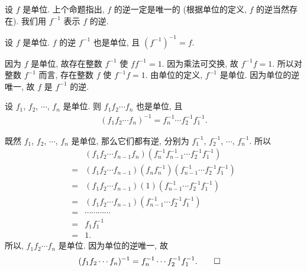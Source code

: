 \begin{definition}
    设 $f$ 是单位. 上个命题指出, $f$ 的逆一定是唯一的 (根据单位的定义, $f$ 的逆当然存在). 我们用 $f^{-1}$ 表示 $f$ 的逆.
\end{definition}

\begin{proposition}
    设 $f$ 是单位. $f$ 的逆 $f^{-1}$ 也是单位, 且 $(f^{-1})^{-1} = f$.
\end{proposition}

\begin{pf}
    因为 $f$ 是单位, 故存在整数 $f^{-1}$ 使 $ff^{-1} = 1$. 因为乘法可交换, 故 $f^{-1} f = 1$. 所以对整数 $f^{-1}$ 而言, 存在整数 $f$ 使 $f^{-1} f = 1$. 由单位的定义, $f^{-1}$ 是单位. 因为单位的逆唯一, 故 $f$ 是 $f^{-1}$ 的逆.
\end{pf}

\begin{proposition}
    设 $f_1$, $f_2$, $\cdots$, $f_n$ 是单位. 则 $f_1 f_2 \cdots f_n$ 也是单位, 且
    \begin{align*}
        (f_1 f_2 \cdots f_n)^{-1} = f_n^{-1} \cdots f_2^{-1} f_1^{-1}.
    \end{align*}
\end{proposition}

\begin{pf}
    既然 $f_1$, $f_2$, $\cdots$, $f_n$ 是单位, 那么它们都有逆, 分别为 $f_1^{-1}$, $f_2^{-1}$, $\cdots$, $f_n^{-1}$. 所以
    \begin{align*}
             & (f_1 f_2 \cdots f_{n-1} f_n) (f_n^{-1} f_{n-1}^{-1} \cdots f_2^{-1} f_1^{-1})   \\
        = {} & (f_1 f_2 \cdots f_{n-1}) (f_n f_n^{-1}) (f_{n-1}^{-1} \cdots f_2^{-1} f_1^{-1}) \\
        = {} & (f_1 f_2 \cdots f_{n-1}) (1) (f_{n-1}^{-1} \cdots f_2^{-1} f_1^{-1})            \\
        = {} & (f_1 f_2 \cdots f_{n-1}) (f_{n-1}^{-1} \cdots f_2^{-1} f_1^{-1})                \\
        = {} & \cdots \cdots \cdots \cdots                                                     \\
        = {} & f_1 f_1^{-1}                                                                    \\
        = {} & 1.
    \end{align*}
    所以, $f_1 f_2 \cdots f_n$ 是单位. 因为单位的逆唯一, 故
    \begin{align*}
         & (f_1 f_2 \cdots f_n)^{-1} = f_n^{-1} \cdots f_2^{-1} f_1^{-1}. \qedhere
    \end{align*}
\end{pf}


